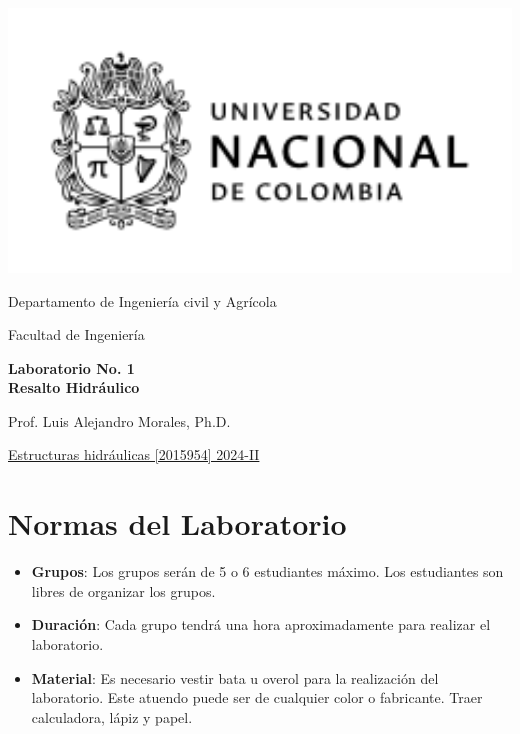\documentclass[10pt, a4paper]{exam}
\begin{document}
	\noindent
	\begin{minipage}[l]{0.1\textwidth}
		\noindent
		\includegraphics[width=2.8\textwidth]{ESCUDO.png}
	\end{minipage}
\hfill
\begin{minipage}[c]{0.8\textwidth}
	\begin{center}
		{\large  Departamento de Ingeniería civil y Agrícola\par
		\large	Facultad de Ingeniería	\par
    \large \textbf{Laboratorio No. 1 \\ Resalto Hidráulico}	\par
} Prof. Luis Alejandro Morales, Ph.D.
	\end{center}
\end{minipage}
\par
\vspace{0.2in}
\noindent
    \uline{Estructuras hidráulicas [2015954]	\hfill 2024-II	}
\par 
\vspace{0.15in}
\noindent

\section{Normas del Laboratorio}
\begin{itemize}
    \item \textbf{Grupos}: Los grupos serán de 5 o 6 estudiantes máximo. Los estudiantes son libres de organizar los grupos.
    
    \item \textbf{Duración}: Cada grupo tendrá una hora aproximadamente para realizar el laboratorio.
    
    \item \textbf{Material}: Es necesario vestir bata u overol para la realización del laboratorio. Este atuendo puede ser de cualquier color o fabricante. Traer calculadora, lápiz y papel.
\end{itemize}
\end{document}
